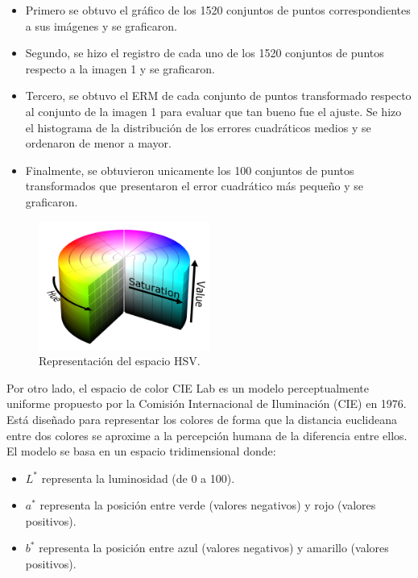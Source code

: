 \documentclass[11pt, letterpaper]{article}
\begin{document}
\begin{itemize}
	\item Primero se obtuvo el gráfico de los 1520 conjuntos de puntos correspondientes a sus imágenes y se graficaron.
	
	\item Segundo, se hizo el registro de cada uno de los 1520 conjuntos de puntos respecto a la imagen 1 y se graficaron. 
	
	\item Tercero, se obtuvo el ERM de cada conjunto de puntos transformado respecto al conjunto de la imagen 1 para evaluar que tan bueno fue el ajuste. Se hizo el histograma de la distribución de los errores cuadráticos medios y se ordenaron de menor a mayor.
	
	\item Finalmente, se obtuvieron unicamente los 100 conjuntos de puntos transformados que presentaron el error cuadrático más pequeño y se graficaron.
	
\end{itemize}

\begin{figure}[h!]
	\centering
	\includegraphics[width=0.5\textwidth]{IMG/REF1.png}
	\caption{Representación del espacio HSV.}
	\label{fig:r1}
\end{figure}

\newpage

Por otro lado, el espacio de color CIE L\*a\*b\* es un modelo perceptualmente uniforme propuesto por la Comisión Internacional de Iluminación (CIE) en 1976. Está diseñado para representar los colores de forma que la distancia euclideana entre dos colores se aproxime a la percepción humana de la diferencia entre ellos. El modelo se basa en un espacio tridimensional donde:

\begin{itemize}
	\item \( L^* \) representa la luminosidad (de 0 a 100).
	\item \( a^* \) representa la posición entre verde (valores negativos) y rojo (valores positivos).
	\item \( b^* \) representa la posición entre azul (valores negativos) y amarillo (valores positivos).
\end{itemize}
\end{document}
